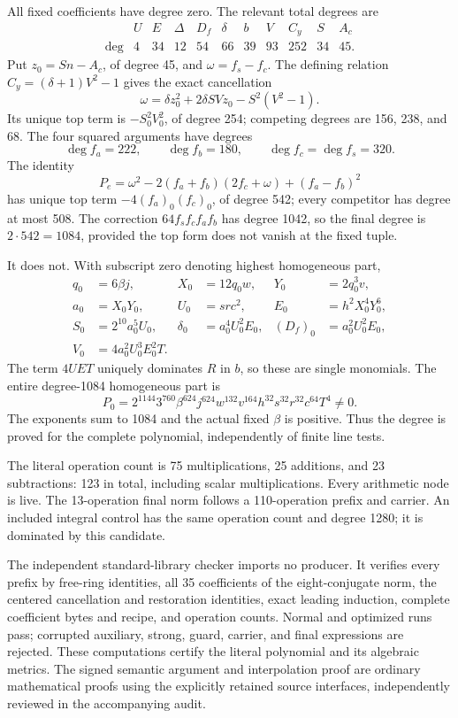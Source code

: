 All fixed coefficients have degree zero.  The relevant total degrees are
\[
\begin{array}{c|rrrrrrrrrr}
 &U&E&\Delta&D_f&\delta&b&V&C_y&S&A_c\\\hline
 \deg&4&34&12&54&66&39&93&252&34&45.
\end{array}
\]
Put $z_0=Sn-A_c$, of degree 45, and $\omega=f_s-f_c$.
The defining relation $C_y=(\delta+1)V^2-1$ gives the exact cancellation
\[
 \omega=\delta z_0^2+2\delta SVz_0-S^2(V^2-1).
\]
Its unique top term is $-S_0^2V_0^2$, of degree 254; competing degrees
are 156, 238, and 68.  The four squared arguments have degrees
\[
 \deg f_a=222,\qquad\deg f_b=180,\qquad
 \deg f_c=\deg f_s=320.
\]
The identity
\[
 P_e=\omega^2-2(f_a+f_b)(2f_c+\omega)+(f_a-f_b)^2
\]
has unique top term $-4(f_a)_0(f_c)_0$, of degree 542; every competitor
has degree at most 508.  The correction $64f_sf_cf_af_b$ has degree
1042, so the final degree is $2\cdot542=1084$, provided the top form
does not vanish at the fixed tuple.

It does not.  With subscript zero denoting highest homogeneous part,
\begin{align*}
 q_0&=6\beta j,&X_0&=12q_0w,&Y_0&=2q_0^3v,\\
 a_0&=X_0Y_0,&U_0&=src^2,&E_0&=h^2X_0^4Y_0^6,\\
 S_0&=2^{10}a_0^5U_0,&\delta_0&=a_0^4U_0^2E_0,
   &(D_f)_0&=a_0^2U_0^2E_0,\\
 V_0&=4a_0^2U_0^3E_0^2T.&&&&
\end{align*}
The term $4UET$ uniquely dominates $R$ in $b$, so these are single
monomials.  The entire degree-1084 homogeneous part is
\begin{equation}
 P_0=2^{1144}3^{760}\beta^{624}
 j^{624}w^{132}v^{164}h^{32}s^{32}r^{32}c^{64}T^4\ne0.
 \label{eq:sat12-top}
\end{equation}
The exponents sum to 1084 and the actual fixed $\beta$ is positive.
Thus the degree is proved for the complete polynomial, independently
of finite line tests.

The literal operation count is 75 multiplications, 25 additions, and
23 subtractions: 123 in total, including scalar multiplications.  Every
arithmetic node is live.  The 13-operation final norm follows a
110-operation prefix and carrier.  An included integral control has the
same operation count and degree 1280; it is dominated by this candidate.

The independent standard-library checker imports no producer.  It
verifies every prefix by free-ring identities, all 35 coefficients of
the eight-conjugate norm, the centered cancellation and restoration
identities, exact leading induction, complete coefficient bytes and
recipe, and operation counts.  Normal and optimized runs pass; corrupted
auxiliary, strong, guard, carrier, and final expressions are rejected.
These computations certify the literal polynomial and its algebraic
metrics.  The signed semantic argument and interpolation proof are
ordinary mathematical proofs using the explicitly retained source
interfaces, independently reviewed in the accompanying audit.

